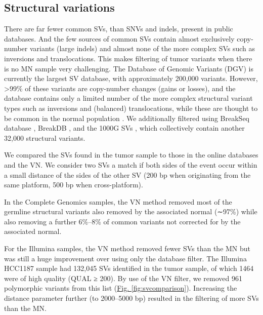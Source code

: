 \subsection*{Structural variations}

There are far fewer common SVs, than SNVs and indels, present in public databases. And the few sources of common SVs contain almost exclusively copy-number variants (large indels) and almost none of the more complex SVs such as inversions and translocations. This makes filtering of tumor variants when there is no MN sample very challenging. The Database of Genomic Variants (DGV) \cite{macdonald2013database} is currently the largest SV database, with approximately 200,000 variants. However, >99\% of these variants are copy-number changes (gains or losses), and the database contains only a limited number of the more complex structural variant types such as inversions and (balanced) translocations, while these are thought to be common in the normal population \cite{feuk2006structural,10002010map,10002012integrated,mills2011mapping}. We additionally filtered using BreakSeq database \cite{lam2010nucleotide}, BreakDB \cite{korbel2009pemer}, and the 1000G SVs \cite{10002010map,10002012integrated}, which collectively contain another 32,000 structural variants.

We compared the SVs found in the tumor sample to those in the online databases and the VN. We consider two SVs a match if both sides of the event occur within a small distance of the sides of the other SV (200 bp when originating from the same platform, 500 bp when cross-platform).

In the Complete Genomics samples, the VN method removed most of the germline structural variants also removed by the associated normal (∼97\%) while also removing a further 6\%–8\% of common variants not corrected for by the associated normal.

For the Illumina samples, the VN method removed fewer SVs than the MN but was still a huge improvement over using only the database filter. The Illumina HCC1187 sample had 132,045 SVs identified in the tumor sample, of which 1464 were of high quality (QUAL ≥ 200). By use of the VN filter, we removed 961 polymorphic variants from this list (\hyperref[fig:svcomparison]{Fig. \ref{fig:svcomparison}}). Increasing the distance parameter further (to 2000–5000 bp) resulted in the filtering of more SVs than the MN.

